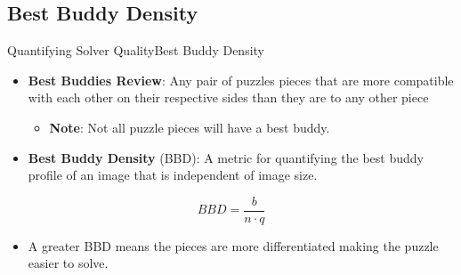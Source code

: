 \documentclass[handout,10pt]{beamer}  %
\begin{document}
\subsection{Best Buddy Density}
\begin{frame}{Quantifying Solver Quality}{Best Buddy Density}
  \begin{itemize}
    \setlength\itemsep{1em}
    \item \textbf{Best Buddies Review}: Any pair of puzzles pieces that are more compatible with each other on their respective sides than they are to any other piece
    \begin{itemize}
      \item \textbf{Note}: Not all puzzle pieces will have a best buddy.
    \end{itemize}
    \vfill
    \item \textbf{Best Buddy Density} (BBD): A metric for quantifying the best buddy profile of an image that is independent of image size.
  \end{itemize}
  \vfill
  \begin{equation} \label{eq:bestBuddyDensity}
    BBD = \frac{b}{n \cdot q}
  \end{equation}
  \vspace{-0.6em}
  \begin{itemize}
    \vfill
    \item A greater BBD means the pieces are more differentiated making the puzzle easier to solve.
  \end{itemize}
\end{frame}
\end{document}
